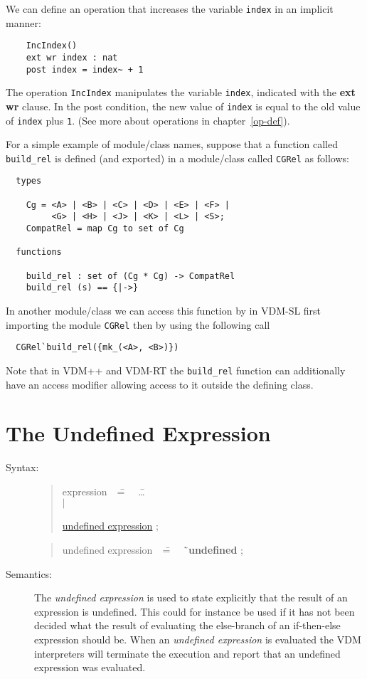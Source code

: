 \documentclass{overturerepchap}
\newcommand{\Rule}[2]{
  \begin{quote}\begin{tabbing}
    #1\index{#1}\ \ \= = \ \ \= #2  ; %

  \end{tabbing}\end{quote}
  }
\newcommand{\Ruleref}[1]{
  \hyperlink{rule:#1}{#1}}
\newcommand{\dsep}{\\ \> $|$ \>}
\newcommand{\Lop}[1]{`{\bf\ttfamily #1}\Quote}
\newcommand{\keyw}[1]{{\bf\ttfamily #1}}
\begin{document}
{\begin{description}
  We can define an operation that increases the variable {\tt index} in
  an implicit manner:
  \begin{lstlisting}
    IncIndex()
    ext wr index : nat
    post index = index~ + 1
  \end{lstlisting}
  The operation {\tt IncIndex} manipulates the variable {\tt index},
  indicated with the \keyw{ext wr} clause. In the post condition, the new
  value of {\tt index} is equal to the old value of {\tt index} plus
  \texttt{1}. (See more about operations in chapter~\ref{op-def}).

  For a simple example of
module/class
  names, suppose that a function called
  \texttt{build\_rel} is defined (and exported) in a
module/class
  called
  \texttt{CGRel} as follows:
\begin{lstlisting}
  types

    Cg = <A> | <B> | <C> | <D> | <E> | <F> |
         <G> | <H> | <J> | <K> | <L> | <S>;
    CompatRel = map Cg to set of Cg

  functions

    build_rel : set of (Cg * Cg) -> CompatRel
    build_rel (s) == {|->}
\end{lstlisting}
In another
module/class
  we can access this function by in VDM-SL
first importing the module \texttt{CGRel} then by
  using the following call
  \begin{lstlisting}
  CGRel`build_rel({mk_(<A>, <B>)})
  \end{lstlisting}
Note that in VDM++ and VDM-RT the \texttt{build\_rel} function can
additionally have
an access modifier allowing access to it outside the defining class.
\end{description}

\section{The Undefined Expression}

\begin{description}
\item[Syntax:]
  \Rule{expression}{
    \ldots \dsep
    \Ruleref{undefined expression}
    }

  \Rule{undefined expression}{
    \Lop{undefined}
    }

\item[Semantics:] The {\it undefined expression} is used to state
  explicitly that the result of an expression is undefined. This could
  for instance be used if it has not been decided what the result of
  evaluating the else-branch of an if-then-else expression should be.
  When an {\it undefined expression} is evaluated the
  VDM interpreters will terminate the execution
  and report that an undefined expression was evaluated.


\end{description}}
\end{document}
